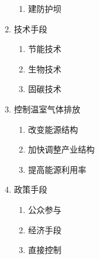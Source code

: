 \documentclass[a4paper]{article}
\begin{document}
\begin{enumerate}
\begin{enumerate}
\begin{enumerate}
                \item 建防护坝
            \end{enumerate}
            \item 技术手段
            \begin{enumerate}
                \item 节能技术
                \item 生物技术
                \item 固碳技术
            \end{enumerate}
            \item 控制温室气体排放
            \begin{enumerate}
                \item 改变能源结构
                \item 加快调整产业结构
                \item 提高能源利用率
            \end{enumerate}
            \item 政策手段
            \begin{enumerate}
                \item 公众参与
                \item 经济手段
                \item 直接控制
            \end{enumerate}
        \end{enumerate}
    \end{enumerate}
\end{document}
